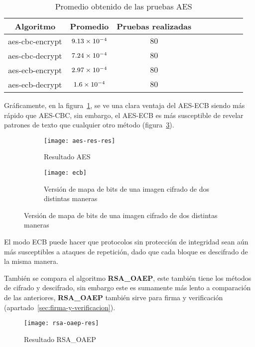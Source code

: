 \documentclass[../main.tex]{subfiles}
\begin{document}
\begin{table}[ht]
  \scriptsize
  \centering
  \caption{Promedio obtenido de las pruebas AES}\label{tab:hash-aes}
  \begin{tabular}{|c|c|c|c|c|c|c|c|c|}
    \hline
    \rowcolor[HTML]{000000}
    {\color[HTML]{FFFFFF} Algoritmo} &
  {\color[HTML]{FFFFFF} Promedio} &
  {\color[HTML]{FFFFFF} Pruebas realizadas} \\ \hline
    aes-cbc-encrypt
  & $\num{9.13E-04}$ & $\num{80}$ \\ \hline
    \rowcolor[HTML]{C0C0C0}
    aes-cbc-decrypt & $\num{7.24E-04}$ & $\num{80}$ \\ \hline
    aes-ecb-encrypt & $\num{2.97E-04}$ & $\num{80}$ \\ \hline
    \rowcolor[HTML]{C0C0C0}
    aes-ecb-decrypt & $\num{1.6E-04}$ & $\num{80}$ \\ \hline
  \end{tabular}
\end{table}

Gráficamente, en la figura~\ref{fig:aes}, se ve una clara ventaja del AES-ECB siendo más rápido que AES-CBC, sin embargo, el
AES-ECB es más susceptible de revelar patrones de texto que cualquier otro método (figura~\ref{fig:ejem}).

\begin{figure}
\begin{subfigure}[b]{0.55\textwidth}
  \centering
  \texttt{[image: aes-res-res]}
  \caption{Resultado AES}\label{fig:aes}
\end{subfigure}
\hfill{}
\begin{subfigure}[b]{0.4\textwidth}
  \centering
  \texttt{[image: ecb]}
  \caption{Versión de mapa de bits de una imagen cifrado de dos distintas maneras}\label{fig:ejem}
\end{subfigure}
\end{figure}


El modo ECB puede hacer que protocolos sin protección de integridad sean aún más
susceptibles a ataques de repetición, dado que cada bloque es descifrado de la misma
manera.

También se compara el algoritmo \textbf{RSA\_OAEP}, este también tiene los métodos
de cifrado y descifrado, sin embargo este es sumamente más lento a comparación
de las anteriores, \textbf{RSA\_OAEP} también sirve para firma y verificación
(apartado~\ref{sec:firma-y-verificacion}).
\begin{figure}[ht]
  \centering{}
  \texttt{[image: rsa-oaep-res]}
  \caption{Resultado RSA\_OAEP}\label{fig:rsa-oaep}
\end{figure}
\end{document}
